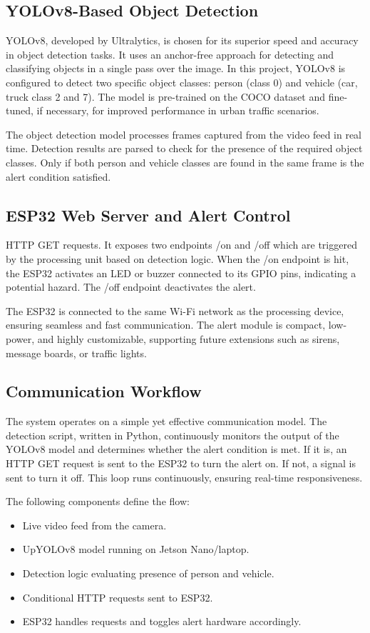 \documentclass[a4paper, 12pt]{report}
\begin{document}
\subsection{YOLOv8-Based Object Detection}

YOLOv8, developed by Ultralytics, is chosen for its superior speed and accuracy in object detection tasks. It uses an anchor-free approach for detecting and classifying objects in a single pass over the image. In this project, YOLOv8 is configured to detect two specific object classes: person (class 0) and vehicle (car, truck class 2 and 7). The model is pre-trained on the COCO dataset and fine-tuned, if necessary, for improved performance in urban traffic scenarios.

The object detection model processes frames captured from the video feed in real time. Detection results are parsed to check for the presence of the required object classes. Only if both person and vehicle classes are found in the same frame is the alert condition satisfied.

\subsection{ESP32 Web Server and Alert Control}
HTTP GET requests. It exposes two endpoints /on and /off which are triggered by the processing unit based on detection logic. When the /on endpoint is hit, the ESP32 activates an LED or buzzer connected to its GPIO pins, indicating a potential hazard. The /off endpoint deactivates the alert.

The ESP32 is connected to the same Wi-Fi network as the processing device, ensuring seamless and fast communication. The alert module is compact, low-power, and highly customizable, supporting future extensions such as sirens, message boards, or traffic lights.

\subsection{Communication Workflow}
The system operates on a simple yet effective communication model. The detection script, written in Python, continuously monitors the output of the YOLOv8 model and determines whether the alert condition is met. If it is, an HTTP GET request is sent to the ESP32 to turn the alert on. If not, a signal is sent to turn it off. This loop runs continuously, ensuring real-time responsiveness.

The following components define the flow:
\begin{itemize}[itemsep=-4pt]
    \item  Live video feed from the camera.
    \item  UpYOLOv8 model running on Jetson Nano/laptop.
    \item Detection logic evaluating presence of person and vehicle.
    \item  Conditional HTTP requests sent to ESP32.
    \item  ESP32 handles requests and toggles alert hardware accordingly.
\end{itemize}
\end{document}
